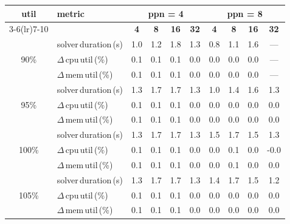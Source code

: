 \begin{tabular}{@{}c l *{8}{c}@{}}
\toprule
\multirow{2}{*}{\textbf{util}} & \multirow{2}{*}{\textbf{metric}} &\multicolumn{4}{c}{\textbf{ppn = 4}} & \multicolumn{4}{c}{\textbf{ppn = 8}}\\
\cmidrule(lr){3-6}\cmidrule(lr){7-10}
 &  & \textbf{4} & \textbf{8} & \textbf{16} & \textbf{32} & \textbf{4} & \textbf{8} & \textbf{16} & \textbf{32}\\
\midrule
\multirow{3}{*}{90\%}
& solver\,duration\,(s) & 1.0 & 1.2 & 1.8 & 1.3 & 0.8 & 1.1 & 1.6 & \multicolumn{1}{c}{—} \\
& $\Delta$\,cpu\,util\,(\%) & 0.1 & 0.1 & 0.1 & 0.0 & 0.0 & 0.0 & 0.0 & \multicolumn{1}{c}{—} \\
& $\Delta$\,mem\,util\,(\%) & 0.1 & 0.1 & 0.1 & 0.0 & 0.0 & 0.0 & 0.0 & \multicolumn{1}{c}{—} \\
\midrule
\multirow{3}{*}{95\%}
& solver\,duration\,(s) & 1.3 & 1.7 & 1.7 & 1.3 & 1.0 & 1.4 & 1.6 & 1.3 \\
& $\Delta$\,cpu\,util\,(\%) & 0.1 & 0.1 & 0.1 & 0.0 & 0.0 & 0.0 & 0.0 & 0.0 \\
& $\Delta$\,mem\,util\,(\%) & 0.1 & 0.1 & 0.1 & 0.0 & 0.0 & 0.0 & 0.0 & 0.0 \\
\midrule
\multirow{3}{*}{100\%}
& solver\,duration\,(s) & 1.3 & 1.7 & 1.7 & 1.3 & 1.5 & 1.7 & 1.5 & 1.3 \\
& $\Delta$\,cpu\,util\,(\%) & 0.1 & 0.1 & 0.1 & 0.0 & 0.0 & 0.1 & 0.0 & -0.0 \\
& $\Delta$\,mem\,util\,(\%) & 0.1 & 0.1 & 0.1 & 0.0 & 0.0 & 0.1 & 0.0 & 0.0 \\
\midrule
\multirow{3}{*}{105\%}
& solver\,duration\,(s) & 1.3 & 1.7 & 1.7 & 1.3 & 1.4 & 1.7 & 1.5 & 1.2 \\
& $\Delta$\,cpu\,util\,(\%) & 0.1 & 0.1 & 0.1 & 0.0 & 0.0 & 0.0 & 0.0 & 0.0 \\
& $\Delta$\,mem\,util\,(\%) & 0.1 & 0.1 & 0.1 & 0.0 & 0.0 & 0.0 & 0.0 & 0.0 \\
\bottomrule
\end{tabular}
